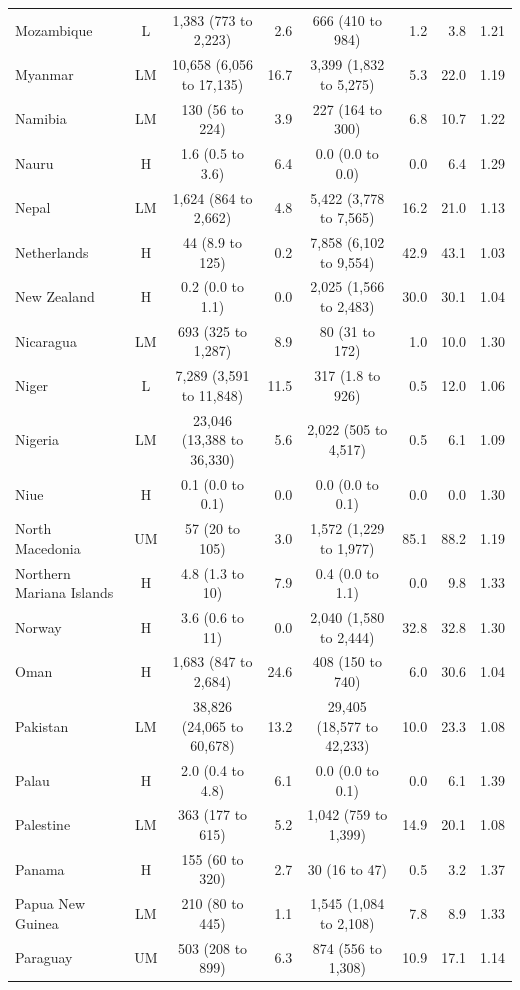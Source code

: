 \begin{longtable}{lccrcrrr}
Mozambique & L & 1,383 (773 to 2,223) & 2.6 & 666 (410 to 984) & 1.2 & 3.8 & 1.21 \\
Myanmar & LM & 10,658 (6,056 to 17,135) & 16.7 & 3,399 (1,832 to 5,275) & 5.3 & 22.0 & 1.19 \\
Namibia & LM & 130 (56 to 224) & 3.9 & 227 (164 to 300) & 6.8 & 10.7 & 1.22 \\
Nauru & H & 1.6 (0.5 to 3.6) & 6.4 & 0.0 (0.0 to 0.0) & 0.0 & 6.4 & 1.29 \\
Nepal & LM & 1,624 (864 to 2,662) & 4.8 & 5,422 (3,778 to 7,565) & 16.2 & 21.0 & 1.13 \\
Netherlands & H & 44 (8.9 to 125) & 0.2 & 7,858 (6,102 to 9,554) & 42.9 & 43.1 & 1.03 \\
New Zealand & H & 0.2 (0.0 to 1.1) & 0.0 & 2,025 (1,566 to 2,483) & 30.0 & 30.1 & 1.04 \\
Nicaragua & LM & 693 (325 to 1,287) & 8.9 & 80 (31 to 172) & 1.0 & 10.0 & 1.30 \\
Niger & L & 7,289 (3,591 to 11,848) & 11.5 & 317 (1.8 to 926) & 0.5 & 12.0 & 1.06 \\
Nigeria & LM & 23,046 (13,388 to 36,330) & 5.6 & 2,022 (505 to 4,517) & 0.5 & 6.1 & 1.09 \\
Niue & H & 0.1 (0.0 to 0.1) & 0.0 & 0.0 (0.0 to 0.1) & 0.0 & 0.0 & 1.30 \\
North Macedonia & UM & 57 (20 to 105) & 3.0 & 1,572 (1,229 to 1,977) & 85.1 & 88.2 & 1.19 \\
Northern Mariana Islands & H & 4.8 (1.3 to 10) & 7.9 & 0.4 (0.0 to 1.1) & 0.0 & 9.8 & 1.33 \\
Norway & H & 3.6 (0.6 to 11) & 0.0 & 2,040 (1,580 to 2,444) & 32.8 & 32.8 & 1.30 \\
Oman & H & 1,683 (847 to 2,684) & 24.6 & 408 (150 to 740) & 6.0 & 30.6 & 1.04 \\
Pakistan & LM & 38,826 (24,065 to 60,678) & 13.2 & 29,405 (18,577 to 42,233) & 10.0 & 23.3 & 1.08 \\
Palau & H & 2.0 (0.4 to 4.8) & 6.1 & 0.0 (0.0 to 0.1) & 0.0 & 6.1 & 1.39 \\
Palestine & LM & 363 (177 to 615) & 5.2 & 1,042 (759 to 1,399) & 14.9 & 20.1 & 1.08 \\
Panama & H & 155 (60 to 320) & 2.7 & 30 (16 to 47) & 0.5 & 3.2 & 1.37 \\
Papua New Guinea & LM & 210 (80 to 445) & 1.1 & 1,545 (1,084 to 2,108) & 7.8 & 8.9 & 1.33 \\
Paraguay & UM & 503 (208 to 899) & 6.3 & 874 (556 to 1,308) & 10.9 & 17.1 & 1.14 \\

\end{longtable}
